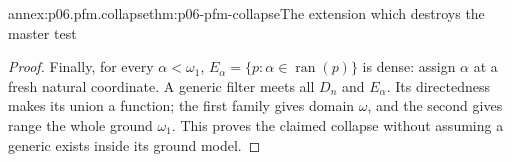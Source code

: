 \begin{annexitem}{annex:p06.pfm.collapse}{thm:p06-pfm-collapse}{The extension which destroys the master test}
\begin{proof}
Finally, for every \(\alpha<\omega_1\),
\(E_\alpha=\{p:\alpha\in\operatorname{ran}(p)\}\) is dense: assign
\(\alpha\) at a fresh natural coordinate.
A generic filter meets all \(D_n\) and \(E_\alpha\).
Its directedness makes its union a function; the first family gives
domain \(\omega\), and the second gives range the whole ground \(\omega_1\).
This proves the claimed collapse without assuming a generic exists
inside its ground model.
\end{proof}
\end{annexitem}
